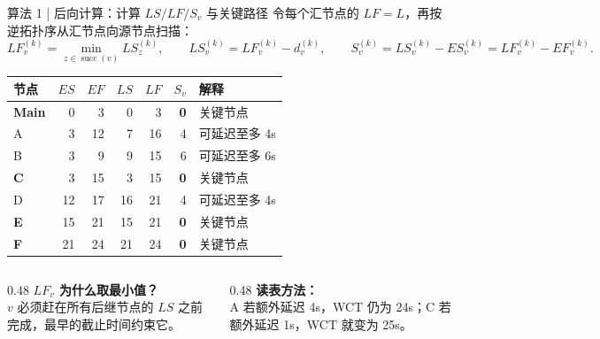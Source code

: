 \begin{frame}{算法 1 | 后向计算：计算 $LS/LF/S_v$ 与关键路径}
  \small
  令每个汇节点的 $LF=L$，再按逆拓扑序从汇节点向源节点扫描：
  \begin{equation}
    LF_v^{(k)}
    =
    \min_{z\in\operatorname{succ}(v)}LS_z^{(k)},
    \qquad
    LS_v^{(k)}=LF_v^{(k)}-d_v^{(k)},
    \qquad
    S_v^{(k)}
    =
    LS_v^{(k)}-ES_v^{(k)}
    =
    LF_v^{(k)}-EF_v^{(k)}.
    \label{eq:cpm-backward}
  \end{equation}

  \scriptsize
  \centering
  \renewcommand{\arraystretch}{1.08}
  \begin{tabularx}{0.94\textwidth}{lrrrrrX}
    \toprule
    节点 & $ES$ & $EF$ & $LS$ & $LF$ & $S_v$ & 解释 \\
    \midrule
    \textcolor{AegisRed}{\textbf{Main}} & 0  & 3  & 0  & 3  & \textbf{0} & 关键节点 \\
    A                                  & 3  & 12 & 7  & 16 & 4          & 可延迟至多 4s \\
    B                                  & 3  & 9  & 9  & 15 & 6          & 可延迟至多 6s \\
    \textcolor{AegisRed}{\textbf{C}}   & 3  & 15 & 3  & 15 & \textbf{0} & 关键节点 \\
    D                                  & 12 & 17 & 16 & 21 & 4          & 可延迟至多 4s \\
    \textcolor{AegisRed}{\textbf{E}}   & 15 & 21 & 15 & 21 & \textbf{0} & 关键节点 \\
    \textcolor{AegisRed}{\textbf{F}}   & 21 & 24 & 21 & 24 & \textbf{0} & 关键节点 \\
    \bottomrule
  \end{tabularx}

  \vspace{0.08cm}
  \begin{columns}[T,onlytextwidth]
    \begin{column}{0.48\textwidth}
      \textbf{$LF_v$ 为什么取最小值？}\\
      $v$ 必须赶在所有后继节点的 $LS$ 之前完成，最早的截止时间约束它。
    \end{column}
    \begin{column}{0.48\textwidth}
      \textbf{读表方法：}\\
      A 若额外延迟 4s，WCT 仍为 24s；C 若额外延迟 1s，WCT 就变为 25s。
    \end{column}
  \end{columns}

  \vspace{0.06cm}
\end{frame}

